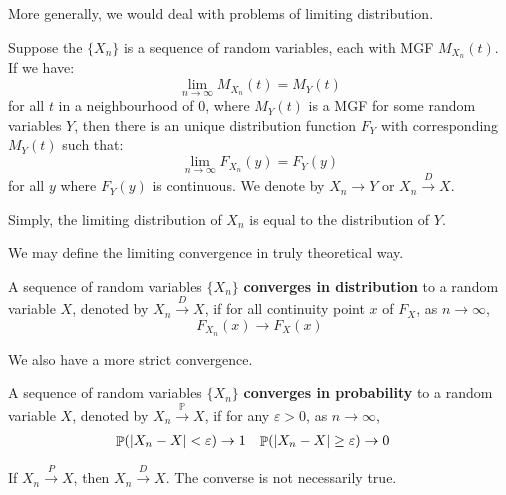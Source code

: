 \documentclass{huhtakm-template-book-v2}
\DeclareMathOperator{\prob}{\mathbb{P}}
\begin{document}
\newpage
More generally, we would deal with problems of limiting distribution.
\begin{thm}
	Suppose the $\{X_{n}\}$ is a sequence of random variables, each with MGF $M_{X_{n}}(t)$. If we have:
	\begin{equation*}
		\lim_{n\to\infty}M_{X_{n}}(t)=M_{Y}(t)
	\end{equation*}
	for all $t$ in a neighbourhood of $0$, where $M_{Y}(t)$ is a MGF for some random variables $Y$, then there is an unique distribution function $F_{Y}$ with corresponding $M_{Y}(t)$ such that:
	\begin{equation*}
		\lim_{n\to\infty}F_{X_{n}}(y)=F_{Y}(y)
	\end{equation*}
	for all $y$ where $F_{Y}(y)$ is continuous. We denote by $X_{n}\to Y$ or $X_{n}\xrightarrow{D}X$.
\end{thm}
\begin{rem}
	Simply, the limiting distribution of $X_{n}$ is equal to the distribution of $Y$.
\end{rem}
We may define the limiting convergence in truly theoretical way.
\begin{defn}
	A sequence of random variables $\{X_{n}\}$ \textbf{converges in distribution} to a random variable $X$, denoted by $X_{n}\xrightarrow{D}X$, if for all continuity point $x$ of $F_{X}$, as $n\to\infty$,
	\begin{equation*}
		F_{X_{n}}(x)\to F_{X}(x)
	\end{equation*}
\end{defn}
We also have a more strict convergence.
\begin{defn}
	A sequence of random variables $\{X_{n}\}$ \textbf{converges in probability} to a random variable $X$, denoted by $X_{n}\xrightarrow{\prob}X$, if for any $\varepsilon>0$, as $n\to\infty$,
	\begin{align*}
		\prob(\abs{X_{n}-X}<\varepsilon)&\to 1 & \prob(\abs{X_{n}-X}\geq\varepsilon)&\to 0
	\end{align*}
\end{defn}
\begin{rem}
	If $X_{n}\xrightarrow{P}X$, then $X_{n}\xrightarrow{D}X$. The converse is not necessarily true.
\end{rem}
\end{document}
